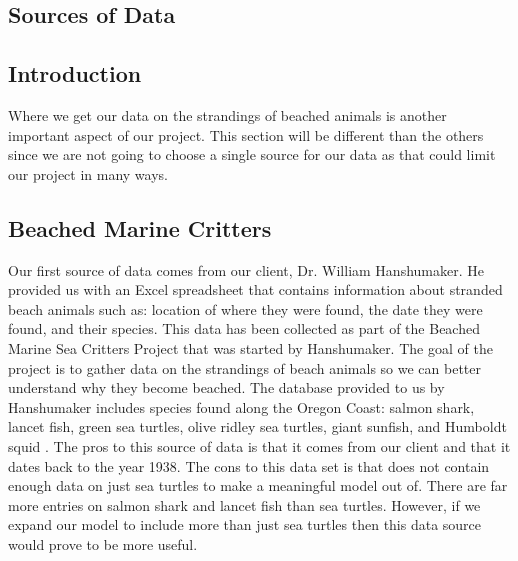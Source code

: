 \documentclass[onecolumn, draftclsnofoot,10pt, compsoc]{IEEEtran}
\begin{document}
\begin{singlespace}
\section{Sources of Data}
\subsection{Introduction}
Where we get our data on the strandings of beached animals is another important aspect of our project. This section will be different than the others since we are not going to choose a single source for our data as that could limit our project in many ways. 

\subsection{Beached Marine Critters}
Our first source of data comes from our client, Dr. William Hanshumaker. He provided us with an Excel spreadsheet that contains information about stranded beach animals such as: location of where they were found, the date they were found, and their species. This data has been collected as part of the Beached Marine Sea Critters Project that was started by Hanshumaker. The goal of the project is to gather data on the strandings of beach animals so we can better understand why they become beached. The database provided to us by Hanshumaker includes  species found along the Oregon Coast: salmon shark, lancet fish, green sea turtles, olive ridley sea turtles, giant sunfish, and Humboldt squid \cite{BEACHED-MARINE}. The pros to this source of data is that it comes from our client and that it dates back to the year 1938. The cons to this data set is that does not contain enough data on just sea turtles to make a meaningful model out of. There are far more entries on salmon shark and lancet fish than sea turtles. However, if we expand our model to include more than just sea turtles then this data source would prove to be more useful.


\end{singlespace}
\end{document}
